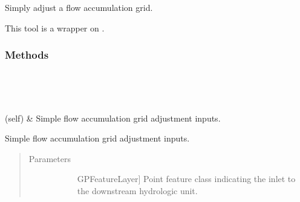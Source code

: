 \documentclass[letterpaper,10pt,english]{sphinxmanual}
\begin{document}
\begin{fulllineitems}
\label{\detokenize{StreamStats_DataPrep:StreamStats_DataPrep.AdjustAccumSimp}}
Simply adjust a flow accumulation grid.

This tool is a wrapper on {\hyperref[\detokenize{make_hydrodem:make_hydrodem.adjust_accum_simple}]{}}.
\subsubsection*{Methods}


\begin{savenotes}\sphinxatlongtablestart\begin{longtable}{}
\hline

\endfirsthead

%
{}\\
\hline

\endhead

\hline
{}\\
\endfoot

\endlastfoot

{\hyperref[\detokenize{StreamStats_DataPrep:StreamStats_DataPrep.AdjustAccumSimp.getParameterInfo}]{}}(self)
&
Simple flow accumulation grid adjustment inputs.
\\
\hline
\end{longtable}\sphinxatlongtableend\end{savenotes}

\begin{fulllineitems}
\label{\detokenize{StreamStats_DataPrep:StreamStats_DataPrep.AdjustAccumSimp.getParameterInfo}}
Simple flow accumulation grid adjustment inputs.
\begin{quote}\begin{description}
\item[{Parameters}] \leavevmode\begin{description}
\item[{}] \leavevmode{[}GPFeatureLayer{]}
Point feature class indicating the inlet to the downstream hydrologic unit.


\end{description}
\end{description}
\end{quote}
\end{fulllineitems}
\end{fulllineitems}
\end{document}
